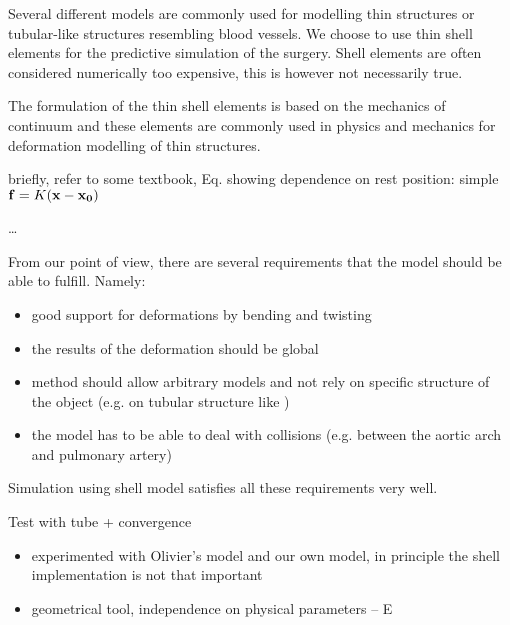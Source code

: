 Several different models are commonly used for modelling thin structures or
tubular-like structures resembling blood vessels. 
We choose to use thin shell elements for the predictive
simulation of the surgery. Shell elements are often considered numerically
too expensive, this is however not necessarily true.

The formulation of the thin shell elements is based on the mechanics of
continuum and these elements are commonly used in physics and mechanics for
deformation modelling of thin structures.

\noindent
briefly, refer to some textbook,
Eq. showing dependence on rest position:
simple $\mathbf{f} = K(\mathbf{x} - \mathbf{x_0})$

\ldots

From our point of view, there are several requirements that the model
should be able to fulfill. Namely:

\begin{itemize}
  \item good support for deformations by bending and twisting
  \item the results of the deformation should be global
  \item method should allow arbitrary models and not rely on specific
  structure of the object (e.g. on tubular structure like \cite{Li2009})
  \item the model has to be able to deal with collisions (e.g. between the
  aortic arch and pulmonary artery)
\end{itemize}

Simulation using shell model satisfies all these requirements very well.

\noindent Test with tube + convergence
\begin{itemize}
  \item experimented with Olivier's model \cite{Comas2010b,Comas2010c} and
  our own model, in principle the shell implementation is not that
  important
  \item geometrical tool, independence on physical parameters -- E
\end{itemize}
